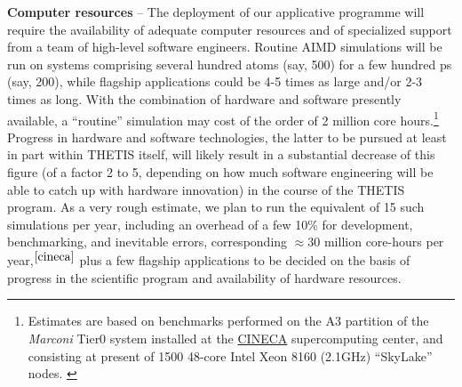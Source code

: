 \medskip\noindent\textbf{Computer resources} -- The deployment of our applicative programme will require the availability of adequate computer resources and of specialized support from a team of high-level software engineers. Routine AIMD simulations will be run on systems comprising several hundred atoms (say, 500) for a few hundred ps (say, 200), while flagship applications could be 4-5 times as large and/or 2-3 times as long. With the combination of hardware and software presently available, a ``routine'' simulation may cost of the order of 2 million core hours.\footnote{Estimates are based on benchmarks performed on the A3 partition of the \emph{Marconi} Tier0 system installed at the \href{http://www.cineca.it}{CINECA} supercomputing center, and consisting at present of 1500 48-core Intel Xeon 8160 (2.1GHz) ``SkyLake'' nodes. \label{cineca}\vspace{-10pt}} Progress in hardware and software technologies, the latter to be pursued at least in part within THETIS itself, will likely result in a substantial decrease of this figure (of a factor 2 to 5, depending on how much software engineering will be able to catch up with hardware innovation) in the course of the THETIS program. As a very rough estimate, we plan to run the equivalent of 15 such simulations per year, including an overhead of a few 10\% for development, benchmarking, and inevitable errors, corresponding $\approx 30$  million core-hours per year,$^{\ref{cineca}}$ plus a few flagship applications to be decided on the basis of progress in the scientific program and availability of hardware resources.

